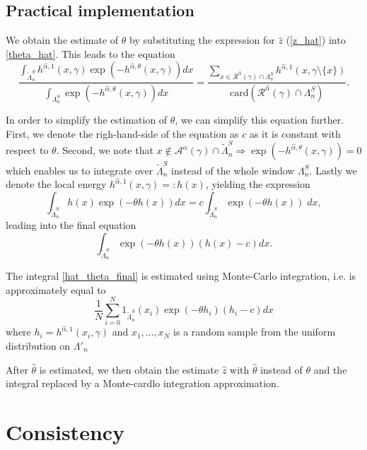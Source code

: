 \subsection{Practical implementation}
We obtain the estimate of $\theta$ by substituting the expression for $\hat z$ (\ref{z_hat}) into \ref{theta_hat}.
This leads to the equation
$$ 
\frac{\int_{\tilde\Lambda^S_n}  h^{\hat\alpha,1}(x,\gamma)\exp{\left(-h^{\hat\alpha,\theta}(x,\gamma)\right)} dx} {  \int_{\Lambda^S_n} \exp{\left( -h^{\hat\alpha,\theta}(x,\gamma)\right)} dx} 
= \frac {\sum_{x \in \mathcal R^{\hat\alpha}(\gamma)\cap \Lambda^S_n} h^{\hat\alpha,1}(x,\gamma\setminus\{x\})} { \mbox{card}(\mathcal R^{\hat\alpha}(\gamma)\cap \Lambda^S_n) }. 
$$

In order to simplify the estimation of $\theta$, we can simplify this equation further. First, we denote the righ-hand-side of the equation as $c$ as it  is constant with respect to $\theta$. Second, we note that $x \notin \mathcal A^\alpha(\gamma)\cap\tilde\Lambda^S_n  \Rightarrow \exp{\left(-h^{\hat\alpha,\theta}(x,\gamma)\right)}= 0$ which enables us to integrate over $\tilde\Lambda^S_n$ instead of the whole window $\Lambda^S_n$. Lastly we denote the local energy $h^{\hat\alpha,1}(x,\gamma) =: h(x)$, yielding the expression
$$ \int_{\tilde\Lambda^S_n} h(x) \exp{\left(-\theta h(x)\right)} dx = c \int_{\tilde\Lambda^S_n} \exp{\left(-\theta h(x)\right)}\;dx, $$
leading into the final equation
\begin{equation}\label{hat_theta_final} 
\int_{\tilde\Lambda^S_n} \exp{\left(-\theta h(x)\right)} (h(x) - c) dx .
\end{equation}

The integral \ref{hat_theta_final} is estimated using Monte-Carlo integration, i.e. is approximately equal to
$$ \frac 1N \sum_{i=0}^N 1_{\tilde\Lambda^S_n}(x_i) \exp{\left( - \theta h_i \right )} (h_i- c) dx $$
where $h_i = h^{\hat\alpha,1}(x_i, \gamma)$ and $x_1,\dots,x_N$ is a random sample from the uniform distribution on $\Lambda'_n$

After $\hat\theta$ is estimated, we then obtain the estimate $\hat z$ with $\hat\theta$ instead of $\theta$ and the integral replaced by a Monte-cardlo integration approximation.


\section{Consistency}
\tbd

